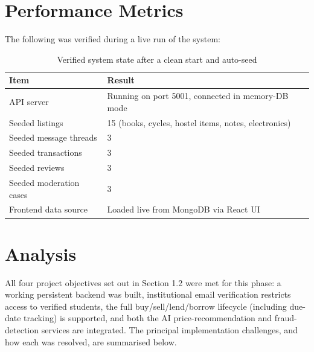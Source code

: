 \documentclass[12pt]{report}
\begin{document}
\section{Performance Metrics}
The following was verified during a live run of the system:

\begin{table}[h]
\centering
\begin{tabular}{@{}ll@{}}
\toprule
\textbf{Item} & \textbf{Result} \\
\midrule
API server & Running on port 5001, connected in memory-DB mode \\
Seeded listings & 15 (books, cycles, hostel items, notes, electronics) \\
Seeded message threads & 3 \\
Seeded transactions & 3 \\
Seeded reviews & 3 \\
Seeded moderation cases & 3 \\
Frontend data source & Loaded live from MongoDB via React UI \\
\bottomrule
\end{tabular}
\caption{Verified system state after a clean start and auto-seed}
\end{table}

\section{Analysis}
All four project objectives set out in Section 1.2 were met for this phase: a working
persistent backend was built, institutional email verification restricts access to verified
students, the full buy/sell/lend/borrow lifecycle (including due-date tracking) is supported,
and both the AI price-recommendation and fraud-detection services are integrated. The
principal implementation challenges, and how each was resolved, are summarised below.
\end{document}
